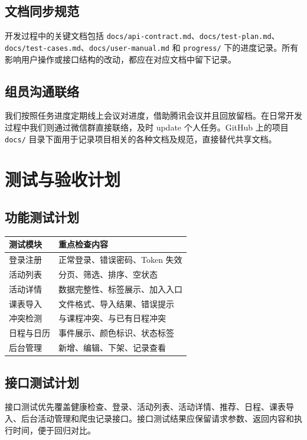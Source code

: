 \documentclass[UTF8,a4paper,12pt,fontset=none]{ctexrep}
\begin{document}
\section{文档同步规范}
开发过程中的关键文档包括 \texttt{docs/api-contract.md}、\texttt{docs/test-plan.md}、\texttt{docs/test-cases.md}、\texttt{docs/user-manual.md} 和 \texttt{progress/} 下的进度记录。所有影响用户操作或接口结构的改动，都应在对应文档中留下记录。

\section{组员沟通联络}
我们按照任务进度定期线上会议对进度，借助腾讯会议并且回放留档。在日常开发过程中我们则通过微信群直接联络，及时 update 个人任务。GitHub 上的项目 \texttt{docs/} 目录下面用于记录项目相关的各种文档及规范，直接替代共享文档。

\chapter{测试与验收计划}

\section{功能测试计划}
\begin{longtable}{|p{}|p{}|}
\hline
\textbf{测试模块} & \textbf{重点检查内容} \\
\hline
登录注册 & 正常登录、错误密码、Token 失效 \\
\hline
活动列表 & 分页、筛选、排序、空状态 \\
\hline
活动详情 & 数据完整性、标签展示、加入入口 \\
\hline
课表导入 & 文件格式、导入结果、错误提示 \\
\hline
冲突检测 & 与课程冲突、与已有日程冲突 \\
\hline
日程与日历 & 事件展示、颜色标识、状态标签 \\
\hline
后台管理 & 新增、编辑、下架、记录查看 \\
\hline
\end{longtable}

\section{接口测试计划}
接口测试优先覆盖健康检查、登录、活动列表、活动详情、推荐、日程、课表导入、后台活动管理和爬虫记录接口。接口测试结果应保留请求参数、返回内容和执行时间，便于回归对比。
\end{document}
